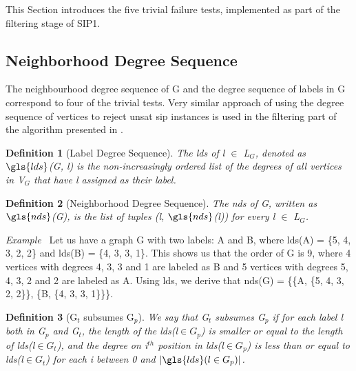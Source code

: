 \documentclass{l4proj}
\newcounter{example}[section]
\newenvironment{example}[1][]{\refstepcounter{example}\par\medskip
   \noindent \textit{Example~\theexample #1} \rmfamily}{\medskip}
\newtheorem{definition}{Definition}
\begin{document}
This Section introduces the five trivial failure tests, implemented as part of the filtering stage of SIP1.

\subsection{Neighborhood Degree Sequence}
\label{sec:nds}
The neighbourhood degree sequence of G and the degree sequence of labels in G correspond to four of the trivial tests. Very similar approach of using the degree sequence of vertices to reject \gls{unsat} \gls{sip} instances is used in the filtering part of the algorithm presented in \cite{Solnon:2010}.
 
\begin{definition}[Label Degree Sequence]
The \textit{\gls{lds}} of \textit{l} $\in$ L$_{G}$, denoted as $\gls{lds}$(G, \textit{l}) is the non-increasingly ordered list of the degrees of all vertices in V$_{G}$ that have \textit{l} assigned as their label.    
\end{definition}

\begin{definition}[Neighborhood Degree Sequence]
The \textit{\gls{nds}} of G, written as $\gls{nds}$(G), is the list of tuples (\textit{l}, $\gls{nds}$(\textit{l})) for every \textit{l} $\in$ L$_{G}$.
\end{definition}

\begin{example}
Let us have a graph G with two labels: A and B, where \gls{lds}(A) = \{5, 4, 3, 2, 2\} and \gls{lds}(B) = \{4, 3, 3, 1\}. This shows us that the order of G is 9, where 4 vertices with degrees 4, 3, 3 and 1 are labeled as B and 5 vertices with degrees 5, 4, 3, 2 and 2 are labeled as A. Using \gls{lds}, we derive that \gls{nds}(G) = \{\{A, \{5, 4, 3, 2, 2\}\}, \{B, \{4, 3, 3, 1\}\}\}.
\end{example}

\begin{definition}[G$_{t}$ subsumes G$_{p}$]
\label{def:subsumes}
We say that G$_{t}$ subsumes G$_{p}$ if for each label l both in G$_{p}$ and G$_{t}$, the length of the \gls{lds}(l$\in G_{p}$) is smaller or equal to the length of \gls{lds}(l$\in G_{t}$), and the degree on i$^{th}$ position in \gls{lds}(l$\in G_{p}$) is less than or equal to \gls{lds}(l$\in G_{t}$) for each i between 0 and $|\gls{lds}(l\in G_{p})|$.
\end{definition}
\end{document}
